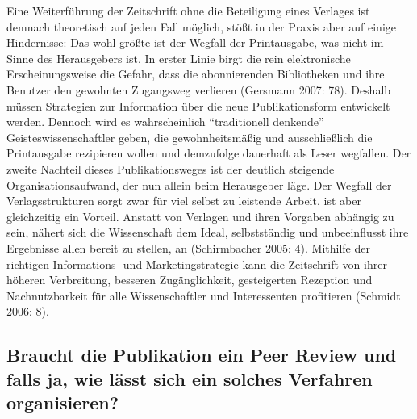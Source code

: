 \documentclass[a4paper,
fontsize=11pt,
oneside,
numbers=noperiodatend,
parskip=half-,
bibliography=totoc,
final
]{scrartcl}
\begin{document}
Eine Weiterführung der Zeitschrift ohne die Beteiligung eines Verlages
ist demnach theoretisch auf jeden Fall möglich, stößt in der Praxis aber
auf einige Hindernisse: Das wohl größte ist der Wegfall der
Printausgabe, was nicht im Sinne des Herausgebers ist. In erster Linie
birgt die rein elektronische Erscheinungsweise die Gefahr, dass die
abonnierenden Bibliotheken und ihre Benutzer den gewohnten Zugangsweg
verlieren (Gersmann 2007: 78). Deshalb müssen Strategien zur Information
über die neue Publikationsform entwickelt werden. Dennoch wird es
wahrscheinlich \enquote{traditionell denkende} Geisteswissenschaftler
geben, die gewohnheitsmäßig und ausschließlich die Printausgabe
rezipieren wollen und demzufolge dauerhaft als Leser wegfallen. Der
zweite Nachteil dieses Publikationsweges ist der deutlich steigende
Organisationsaufwand, der nun allein beim Herausgeber läge. Der Wegfall
der Verlagsstrukturen sorgt zwar für viel selbst zu leistende Arbeit,
ist aber gleichzeitig ein Vorteil. Anstatt von Verlagen und ihren
Vorgaben abhängig zu sein, nähert sich die Wissenschaft dem Ideal,
selbstständig und unbeeinflusst ihre Ergebnisse allen bereit zu stellen,
an (Schirmbacher 2005: 4). Mithilfe der richtigen Informations- und
Marketingstrategie kann die Zeitschrift von ihrer höheren Verbreitung,
besseren Zugänglichkeit, gesteigerten Rezeption und Nachnutzbarkeit für
alle Wissenschaftler und Interessenten profitieren (Schmidt 2006: 8).

\subsection*{Braucht die Publikation ein Peer Review und falls ja, wie
lässt sich ein solches Verfahren
organisieren?}\label{braucht-die-publikation-ein-peer-review-und-falls-ja-wie-luxe4sst-sich-ein-solches-verfahren-organisieren}
\end{document}
